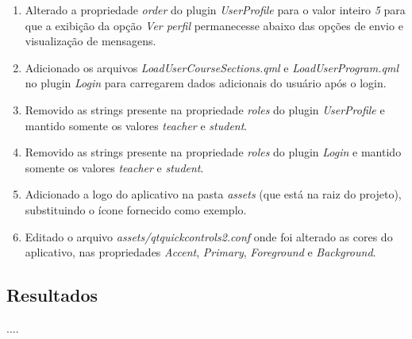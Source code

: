 \begin{enumerate}
	\item Alterado a propriedade \textit{order} do plugin \textit{UserProfile} para o valor inteiro \textit{5} para que a exibição da opção \textit{Ver perfil} permanecesse abaixo das opções de envio e visualização de mensagens.

	\item Adicionado os arquivos \textit{LoadUserCourseSections.qml} e \textit{LoadUserProgram.qml} no plugin \textit{Login} para carregarem dados adicionais do usuário após o login.

	\item Removido as strings presente na propriedade \textit{roles} do plugin \textit{UserProfile} e mantido somente os valores \textit{teacher} e \textit{student}.

	\item Removido as strings presente na propriedade \textit{roles} do plugin \textit{Login} e mantido somente os valores \textit{teacher} e \textit{student}.

	\item Adicionado a logo do aplicativo na pasta \textit{assets} (que está na raiz do projeto), substituindo o ícone fornecido como exemplo.

	\item Editado o arquivo \textit{assets/qtquickcontrols2.conf} onde foi alterado as cores do aplicativo, nas propriedades \textit{Accent}, \textit{Primary}, \textit{Foreground} e \textit{Background}.
\end{enumerate}


\subsection{Resultados}
....